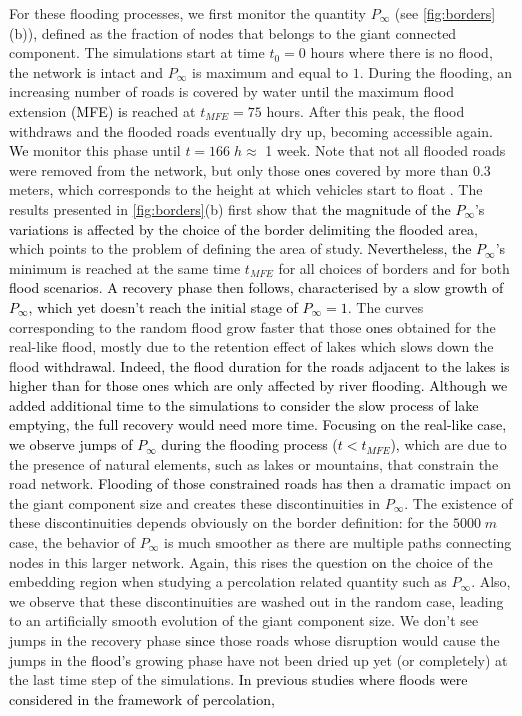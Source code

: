 \documentclass[twocolumn,fleqn,10pt]{wlscirep}
\begin{document}
For these flooding processes, we first monitor the quantity $P_\infty$ (see \cref{fig:borders}(b))\textcolor{black}{,} defined as the fraction of nodes that belongs to the giant connected component. The simulations start at time $t_0=0$ hours where there is no flood, the network is intact and $P_\infty$ is maximum and equal to $1$. During the flooding, an increasing number of roads is covered by water until the maximum flood extension \textcolor{black}{(MFE) is} reached at $t_{MFE}=75$ hours. After this peak, the flood withdraws and \textcolor{black}{the} flooded roads eventually dry up, becoming accessible again\textcolor{black}{. We} monitor this  phase until $t=166 \;h\approx$ 1 week. Note that not all flooded roads were removed from the network, but only those \textcolor{black}{ones} covered by more than $0.3$ meters\textcolor{black}{,} which corresponds to the height at which vehicles start to float \cite{Pregnolato}. The results presented in \cref{fig:borders}(b) first show that \textcolor{black}{the magnitude of the $P_\infty$'s variations is affected by the choice of the border delimiting the flooded area},
which points to the problem of defining the area of study\textcolor{black}{. Nevertheless, the $P_\infty$'s} minimum is reached at the same time $t_{MFE}$ for all choices of borders and for both \textcolor{black}{flood scenarios}. \textcolor{black}{A recovery phase then follows, characterised by a slow growth of $P_\infty$, which yet doesn't reach the initial stage of $P_\infty=1$}. The curves corresponding to the random flood grow faster that those \textcolor{black}{ones} obtained for the real-like flood, mostly due to the retention effect of lakes which slows down the flood \textcolor{black}{withdrawal}.
\textcolor{black}{
Indeed, the flood duration for the roads adjacent to the lakes is higher than for those ones which are only affected by river flooding. Although we added additional time to the simulations to consider the slow process of lake emptying, the full recovery would need more time.}
\textcolor{black}{Focusing on the real-like case, we observe jumps of $P_\infty$ during the flooding process ($t<t_{MFE}$),} which are due to the presence of natural elements\textcolor{black}{,} such as lakes or mountains, that constrain the road network\textcolor{black}{. Flooding of those constrained roads has then} a dramatic impact on the giant component size and creates these discontinuities in $P_\infty$. The existence of these discontinuities depends obviously on the border definition: for the $5000 \; m$ case, the behavior of $P_\infty$ is much smoother as there are multiple paths connecting nodes in this larger network. Again, this rises the question \textcolor{black}{on} the choice of the embedding region when studying a percolation related quantity such as $P_\infty$. Also, we observe that these discontinuities are washed out in the random case\textcolor{black}{,} leading to an artificially smooth evolution of the giant component size. We don't see jumps in the recovery phase \textcolor{black}{since} those roads whose disruption would cause the jumps in the \textcolor{black}{flood's} growing phase have not been dried up yet (or completely) at the last time step of the simulations. \textcolor{black}{In previous studies where floods were considered in the framework of percolation,}
\end{document}
